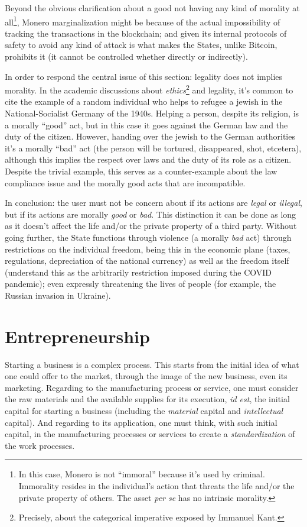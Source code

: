 \documentclass[12pt,a4paper]{article}
\begin{document}
Beyond the obvious clarification about a good not having any kind of morality at all\footnote{In this case, Monero is not “immoral” because it's used by criminal. Immorality resides in the individual's action that threats the life and/or the private property of others. The asset \textit{per se} has no intrinsic morality.}, Monero marginalization might be because of the actual impossibility of tracking the transactions in the blockchain; and given its internal protocols of safety to avoid any kind of attack is what makes the States, unlike Bitcoin, prohibits it (it cannot be controlled whether directly or indirectly).

In order to respond the central issue of this section: legality does not implies morality. In the academic discussions about \textit{ethics}\footnote{Precisely, about the categorical imperative exposed by Immanuel Kant.} and legality, it's common to cite the example of a random individual who helps to refugee a jewish in the National-Socialist Germany of the 1940s. Helping a person, despite its religion, is a morally “good” act, but in this case it goes against the German law and the duty of the citizen. However, handing over the jewish to the German authorities it's a morally “bad” act (the person will be tortured, disappeared, shot, etcetera), although this implies the respect over laws and the duty of its role as a citizen. Despite the trivial example, this serves as a counter-example about the law compliance issue and the morally good acts that are incompatible.

In conclusion: the user must not be concern about if its actions are \textit{legal} or \textit{illegal}, but if its actions are morally \textit{good} or \textit{bad}. This distinction it can be done as long as it doesn't affect the life and/or the private property of a third party. Without going further, the State functions through violence (a morally \textit{bad} act) through restrictions on the individual freedom, being this in the economic plane (taxes, regulations, depreciation of the national currency) as well as the freedom itself (understand this as the arbitrarily restriction imposed during the COVID pandemic); even expressly threatening the lives of people (for example, the Russian invasion in Ukraine).

\section{Entrepreneurship}
Starting a business is a complex process. This starts from the initial idea of what one could offer to the market, through the image of the new business, even its marketing. Regarding to the manufacturing process or service, one must consider the raw materials and the available supplies for its execution, \textit{id est}, the initial capital for starting a business (including the \textit{material} capital and \textit{intellectual} capital). And regarding to its application, one must think, with such initial capital, in the manufacturing processes or services to create a \textit{standardization} of the work processes.
\end{document}
